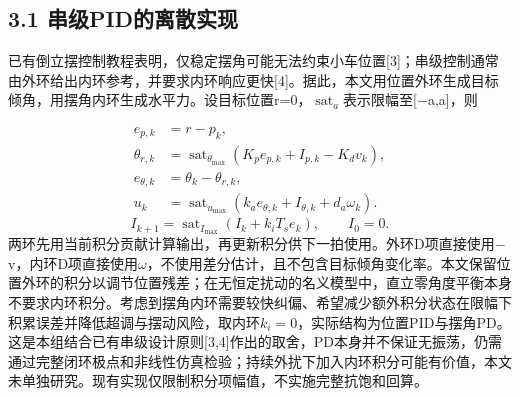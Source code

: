 \documentclass[UTF8,a4paper,fontset=fandol,zihao=5]{ctexart}
\begin{document}
\subsection*{3.1 串级PID的离散实现}
已有倒立摆控制教程表明，仅稳定摆角可能无法约束小车位置[3]；串级控制通常由外环给出内环参考，并要求内环响应更快[4]。据此，本文用位置外环生成目标倾角，用摆角内环生成水平力。设目标位置r=0，$\operatorname{sat}_a$表示限幅至[$-$a,a]，则\par
\[
\begin{aligned}e_{p,k}&=r-p_k,\\\theta_{r,k}&=\operatorname{sat}_{\theta_{\max}}(K_pe_{p,k}+I_{p,k}-K_dv_k),\\e_{\theta,k}&=\theta_k-\theta_{r,k},\\u_k&=\operatorname{sat}_{u_{\max}}(k_ae_{\theta,k}+I_{\theta,k}+d_a\omega_k).\end{aligned}
\]
\[
I_{k+1}=\operatorname{sat}_{I_{\max}}(I_k+k_iT_se_k),\qquad I_0=0.
\]
两环先用当前积分贡献计算输出，再更新积分供下一拍使用。外环D项直接使用$-$v，内环D项直接使用$\omega$，不使用差分估计，且不包含目标倾角变化率。本文保留位置外环的积分以调节位置残差；在无恒定扰动的名义模型中，直立零角度平衡本身不要求内环积分。考虑到摆角内环需要较快纠偏、希望减少额外积分状态在限幅下积累误差并降低超调与摆动风险，取内环$k_i=0$，实际结构为位置PID与摆角PD。这是本组结合已有串级设计原则[3,4]作出的取舍，PD本身并不保证无振荡，仍需通过完整闭环极点和非线性仿真检验；持续外扰下加入内环积分可能有价值，本文未单独研究。现有实现仅限制积分项幅值，不实施完整抗饱和回算。\par
\newpage
\end{document}
